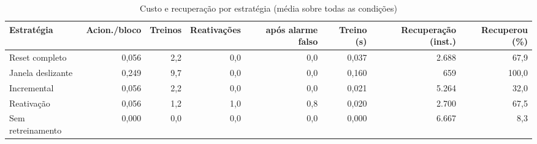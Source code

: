 \begin{table}[htbp]
\centering
\small
\caption{Custo e recuperação por estratégia (média sobre todas as condições)}
\label{tab:custo}
\begin{adjustbox}{max width=\textwidth}
\begin{tabular}{lrrrrrrr}
\toprule
Estratégia & Acion./bloco & Treinos & Reativações & \quad após alarme falso & Treino (s) & Recuperação (inst.) & Recuperou (\%) \\
\midrule
Reset completo & 0,056 & 2,2 & 0,0 & 0,0 & 0,037 & 2.688 & 67,9 \\
Janela deslizante & 0,249 & 9,7 & 0,0 & 0,0 & 0,160 & 659 & 100,0 \\
Incremental & 0,056 & 2,2 & 0,0 & 0,0 & 0,021 & 5.264 & 32,0 \\
Reativação & 0,056 & 1,2 & 1,0 & 0,8 & 0,020 & 2.700 & 67,5 \\
Sem retreinamento & 0,000 & 0,0 & 0,0 & 0,0 & 0,000 & 6.667 & 8,3 \\
\bottomrule
\end{tabular}
\end{adjustbox}
\par\vspace{2pt}{\footnotesize Reativações após alarme falso: o candidato escolhido era o próprio modelo corrente, isto é, não houve mudança de modelo. Recuperação: instâncias após o fim da transição até a acurácia do bloco voltar a até 3 p.p. da acurácia pré-drift (censurada no fim do segmento).}
\end{table}
